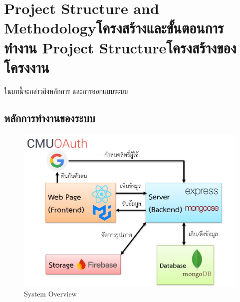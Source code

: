 \chapter{\ifproject%
\ifenglish Project Structure and Methodology\else โครงสร้างและขั้นตอนการทำงาน\fi
\else%
\ifenglish Project Structure\else โครงสร้างของโครงงาน\fi
\fi
}


ในบทนี้จะกล่าวถึงหลักการ และการออกแบบระบบ

\makeatletter


\makeatother

\section{หลักการทำงานของระบบ}

\begin{figure}[h!]
\begin{center}
\includegraphics[scale=0.6]{public/sys-overview.jpg}
\end{center}
\caption[Poem]{System Overview}
\label{fig:sys-overview}
\end{figure}

